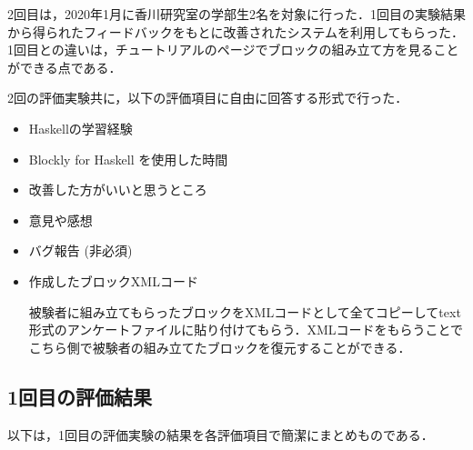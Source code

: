 \documentclass{risepaper}
\begin{document}
2回目は，2020年1月に香川研究室の学部生2名を対象に行った．1回目の実験結果から得られたフィードバックをもとに改善されたシステムを利用してもらった．1回目との違いは，チュートリアルのページでブロックの組み立て方を見ることができる点である．

2回の評価実験共に，以下の評価項目に自由に回答する形式で行った．

\begin{itemize}
\item Haskellの学習経験
\item Blockly for Haskell を使用した時間
\item 改善した方がいいと思うところ
\item 意見や感想
\item バグ報告 (非必須)
\item 作成したブロックXMLコード

被験者に組み立てもらったブロックをXMLコードとして全てコピーしてtext形式のアンケートファイルに貼り付けてもらう．XMLコードをもらうことでこちら側で被験者の組み立てたブロックを復元することができる．
\end{itemize} 

		\subsection{1回目の評価結果}

以下は，1回目の評価実験の結果を各評価項目で簡潔にまとめものである．
\end{document}
